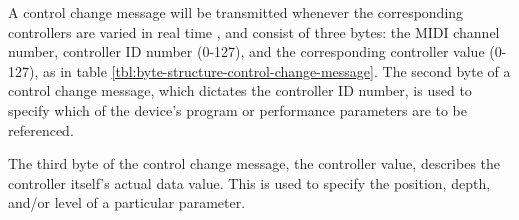 A control change message will be transmitted whenever the corresponding controllers are varied in real time \cite{Huber_2012}, and consist of three bytes: the MIDI channel number, controller ID number (0-127), and the corresponding controller value (0-127), as in table \ref{tbl:byte-structure-control-change-message}. The second byte of a control change message, which dictates the controller ID number, is used to specify which of the device's program or performance parameters are to be referenced. 

The third byte of the control change message, the controller value, describes the controller itself's actual data value. This is used to specify the position, depth, and/or level of a particular parameter\cite{Huber_2012}.